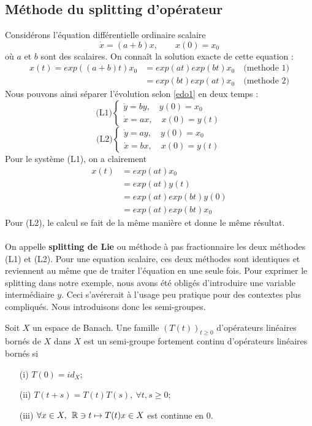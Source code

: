 \subsection{Méthode du splitting d’opérateur}
Considérons l’équation différentielle ordinaire scalaire
\begin{equation} \label{edo1}
\dot{x}=(a+b)x, \quad \quad x(0)=x_0
\end{equation}
où $a$ et $b$ sont des scalaires. On connaît la solution exacte de cette equation :
\begin{align*}
x(t)=exp((a+b)t)x_0 &= exp(at)exp(bt)x_0 \quad \mbox{(methode 1)}\\
&= exp(bt)exp(at)x_0 \quad \mbox{(methode 2)}
\end{align*}
Nous pouvons ainsi séparer l'évolution selon \eqref{edo1} en deux temps :
$$\mbox{(L1)}
\begin{cases}
\dot{y}=by,\quad y(0)=x_0\\
\dot{x}=ax,\quad x(0)=y(t)
\end{cases}
$$
$$\mbox{(L2)}
\begin{cases}
\dot{y}=ay,\quad y(0)=x_0\\
\dot{x}=bx,\quad x(0)=y(t)
\end{cases}
$$
Pour le système (L1), on a clairement
\begin{align*}
x(t) &= exp(at)x_0\\
&= exp(at)y(t)\\
&= exp(at)exp(bt)y(0)\\
&= exp(at)exp(bt)x_0
\end{align*}
Pour (L2), le calcul se fait de la même manière et donne le même résultat.\\\\
On appelle \textbf{splitting de Lie} ou méthode à pas fractionnaire les deux méthodes (L1) et (L2). Pour une equation scalaire, ces deux méthodes sont identiques et reviennent au même que de traiter l’équation en une seule fois.
Pour exprimer le splitting dans notre exemple, nous avons été obligés d’introduire une variable intermédiaire $y$. Ceci s’avérerait à l’usage peu pratique pour des contextes plus compliqués. Nous introduisons donc les semi-groupes.
\begin{definition}
Soit $X$ un espace de Banach. Une famille $(T(t))_{t \geq 0}$ d'opérateurs linéaires bornés de $X$ dans $X$ est un semi-groupe fortement continu d'opérateurs linéaires bornés si
\begin{enumerate}
	\item[(i)] $T(0)=id_X$;
	\item[(ii)] $T(t+s)=T(t)T(s), \: \forall t, s \geq 0$;
	\item[(iii)] $\forall x \in X, \:\: \mathbb R \ni t \mapsto T(t)x \in X$ est continue en $0$.  
\end{enumerate}
\end{definition}
